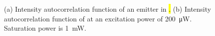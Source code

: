 		\begin{figure}[!htb]
			\begin{subfigure}[tp]{ 0.49\linewidth}
				\centering
				\caption{}\label{subfig::g2_a}
			\end{subfigure}
			\hfill
			\begin{subfigure}[tp]{ 0.49\linewidth}
				\centering
				\caption{}\label{subfig::g2_b}
			\end{subfigure}
			\caption[Intensity autocorrelation measurements of \hl and \vl]{(a) Intensity autocorrelation function of an emitter in \hl. (b) Intensity autocorrelation function of \embroad at an excitation power of \SIlist{200}{\micro\W}. Saturation power is \SI{1}{mW}.}
			\label{fig::g2}
		\end{figure}

